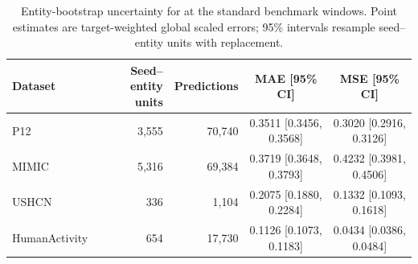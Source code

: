 \documentclass[preprint,12pt]{elsarticle}
\begin{document}
\begin{table}[!htbp]
\caption{\method{} standard-window seed stability. Entries are global scaled
errors for the three independent seeds used in Table~\ref{tab:main-results}.
Lower is better. Among seed rows, \textbf{bold} marks the lowest error and
\underline{underlining} marks the second-lowest error in each column.}
\label{tab:adept-seeds}
\centering
\scriptsize
{}
\end{table}

\begin{table}[!htbp]
\caption{Entity-bootstrap uncertainty for \method{} at the standard benchmark
windows. Point estimates are target-weighted global scaled errors; 95\%
intervals resample seed--entity units with replacement.}
\label{tab:entity-bootstrap}
\centering
\scriptsize
\begin{tabular}{l|r|r|c|c}
\toprule
Dataset & Seed--entity units & Predictions & MAE [95\% CI] & MSE [95\% CI] \\
\midrule
P12 & 3,555 & 70,740 & 0.3511 [0.3456, 0.3568] & 0.3020 [0.2916, 0.3126] \\
MIMIC & 5,316 & 69,384 & 0.3719 [0.3648, 0.3793] & 0.4232 [0.3981, 0.4506] \\
USHCN & 336 & 1,104 & 0.2075 [0.1880, 0.2284] & 0.1332 [0.1093, 0.1618] \\
HumanActivity & 654 & 17,730 & 0.1126 [0.1073, 0.1183] & 0.0434 [0.0386, 0.0484] \\
\bottomrule
\end{tabular}
\end{table}
\end{document}
